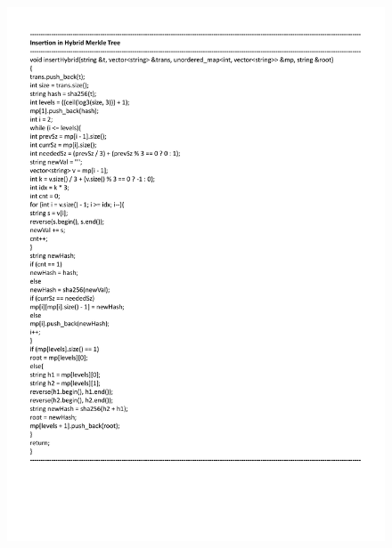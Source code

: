 \begin{figure}[H]
    \centering
    \includegraphics[scale=0.65]{figures/insert hybrid.pdf}
 
\end{figure}


 

